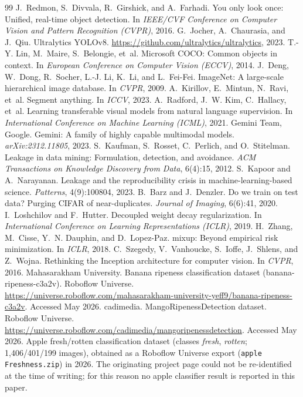 \documentclass[10pt,twocolumn]{article}
\begin{document}
\begin{thebibliography}{99}
 J.~Redmon, S.~Divvala, R.~Girshick, and A.~Farhadi. You only look once: Unified, real-time object detection. In \emph{IEEE/CVF Conference on Computer Vision and Pattern Recognition (CVPR)}, 2016.
 G.~Jocher, A.~Chaurasia, and J.~Qiu. Ultralytics YOLOv8. \url{https://github.com/ultralytics/ultralytics}, 2023.
 T.-Y. Lin, M.~Maire, S.~Belongie, et~al. Microsoft COCO: Common objects in context. In \emph{European Conference on Computer Vision (ECCV)}, 2014.
 J.~Deng, W.~Dong, R.~Socher, L.-J. Li, K.~Li, and L.~Fei-Fei. ImageNet: A large-scale hierarchical image database. In \emph{CVPR}, 2009.
 A.~Kirillov, E.~Mintun, N.~Ravi, et~al. Segment anything. In \emph{ICCV}, 2023.
 A.~Radford, J.~W. Kim, C.~Hallacy, et~al. Learning transferable visual models from natural language supervision. In \emph{International Conference on Machine Learning (ICML)}, 2021.
 Gemini Team, Google. Gemini: A family of highly capable multimodal models. \emph{arXiv:2312.11805}, 2023.
 S.~Kaufman, S.~Rosset, C.~Perlich, and O.~Stitelman. Leakage in data mining: Formulation, detection, and avoidance. \emph{ACM Transactions on Knowledge Discovery from Data}, 6(4):15, 2012.
 S.~Kapoor and A.~Narayanan. Leakage and the reproducibility crisis in machine-learning-based science. \emph{Patterns}, 4(9):100804, 2023.
 B.~Barz and J.~Denzler. Do we train on test data? Purging CIFAR of near-duplicates. \emph{Journal of Imaging}, 6(6):41, 2020.
 I.~Loshchilov and F.~Hutter. Decoupled weight decay regularization. In \emph{International Conference on Learning Representations (ICLR)}, 2019.
 H.~Zhang, M.~Cisse, Y.~N. Dauphin, and D.~Lopez-Paz. mixup: Beyond empirical risk minimization. In \emph{ICLR}, 2018.
 C.~Szegedy, V.~Vanhoucke, S.~Ioffe, J.~Shlens, and Z.~Wojna. Rethinking the Inception architecture for computer vision. In \emph{CVPR}, 2016.
 Mahasarakham University. Banana ripeness classification dataset (banana-ripeness-c3a2v). Roboflow Universe. \url{https://universe.roboflow.com/mahasarakham-university-yeff9/banana-ripeness-c3a2v}. Accessed May 2026.
 cadimedia. MangoRipenessDetection dataset. Roboflow Universe. \url{https://universe.roboflow.com/cadimedia/mangoripenessdetection}. Accessed May 2026.
 Apple fresh/rotten classification dataset (classes \emph{fresh}, \emph{rotten}; 1{,}406/401/199 images), obtained as a Roboflow Universe export (\texttt{apple Freshness.zip}) in 2026. The originating project page could not be re-identified at the time of writing; for this reason no apple classifier result is reported in this paper.
\end{thebibliography}
\end{document}
